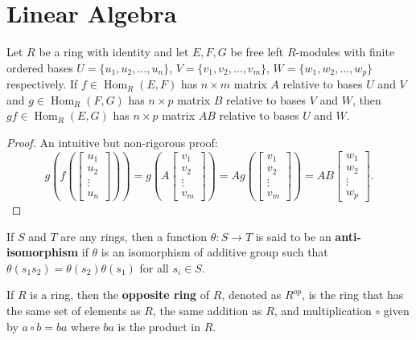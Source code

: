 \documentclass{article}
\DeclareMathOperator{\Hom}{Hom}
\begin{document}
\section{Linear Algebra}
\begin{theorem}
    Let $R$ be a ring with identity and let $E,F,G$ be free left $R$-modules with finite ordered bases $U=\{u_{1},u_{2}, \ldots,u_{n}\}$, $V=\{v_{1},v_{2}, \ldots,v_{m}\}$, $W=\{w_{1},w_{2}, \ldots,w_{p}\}$ respectively. If $f \in \Hom_{R}(E, F)$ has $n \times m$ matrix $A$ relative to bases $U$ and $V$ and $g \in \Hom_{R}(F, G)$ has $n \times p$ matrix $B$ relative to bases $V$ and $W$, then $gf \in \Hom_{R}(E, G)$ has $n \times p$ matrix $AB$ relative to bases $U$ and $W$.
\end{theorem}
\begin{proof}
    An intuitive but non-rigorous proof:
    $$g(f(\begin{bmatrix} u_1 \\ u_2 \\ \vdots \\ u_n \end{bmatrix}))=g(A\begin{bmatrix} v_1 \\ v_2 \\ \vdots \\ v_m \end{bmatrix})=Ag(\begin{bmatrix} v_1 \\ v_2 \\ \vdots \\ v_m \end{bmatrix})=AB \begin{bmatrix} w_1 \\ w_2 \\ \vdots \\ w_p \end{bmatrix}.$$
\end{proof}
\begin{definition}
    If $S$ and $T$ are any rings, then a function $\theta:S\to T$ is said to be an \textbf{anti-isomorphism} if $\theta$ is an isomorphism of additive group such that $\theta(s_{1}s_{2})=\theta(s_{2})\theta(s_{1})$ for all $s_{i} \in S$.

    If $R $ is a ring, then the \textbf{opposite ring} of $R$, denoted as $R^{op}$, is the ring that has the same set of elements as $R$, the same addition as $R$, and multiplication $\circ$ given by $a \circ b=ba$ where $ba$ is the product in $R$.
\end{definition}
\end{document}
